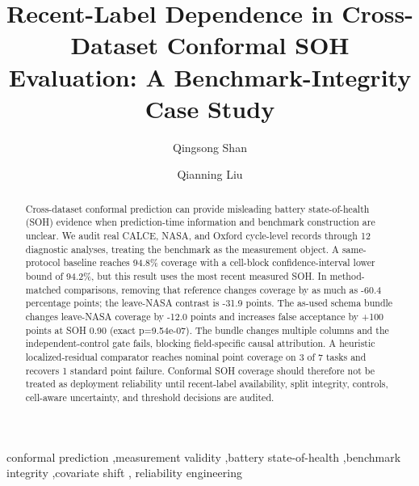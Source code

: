 \documentclass[
  number,
  preprint]{elsarticle}
\begin{document}
\begin{frontmatter}
\title{Recent-Label Dependence in Cross-Dataset Conformal SOH
Evaluation: A Benchmark-Integrity Case Study}
\author[1]{Qingsong Shan%
%
}
\author[1]{Qianning Liu%
%
}


        
\begin{abstract}
Cross-dataset conformal prediction can provide misleading battery
state-of-health (SOH) evidence when prediction-time information and
benchmark construction are unclear. We audit real CALCE, NASA, and
Oxford cycle-level records through 12 diagnostic analyses, treating the
benchmark as the measurement object. A same-protocol baseline reaches
94.8\% coverage with a cell-block confidence-interval lower bound of
94.2\%, but this result uses the most recent measured SOH. In
method-matched comparisons, removing that reference changes coverage by
as much as -60.4 percentage points; the leave-NASA contrast is -31.9
points. The as-used schema bundle changes leave-NASA coverage by -12.0
points and increases false acceptance by +100 points at SOH 0.90 (exact
p=9.54e-07). The bundle changes multiple columns and the
independent-control gate fails, blocking field-specific causal
attribution. A heuristic localized-residual comparator reaches nominal
point coverage on 3 of 7 tasks and recovers 1 standard point failure.
Conformal SOH coverage should therefore not be treated as deployment
reliability until recent-label availability, split integrity, controls,
cell-aware uncertainty, and threshold decisions are audited.
\end{abstract}





\begin{keyword}
    conformal prediction \sep measurement validity \sep battery
state-of-health \sep benchmark integrity \sep covariate shift \sep 
    reliability engineering
\end{keyword}
\end{frontmatter}
    
\end{document}
